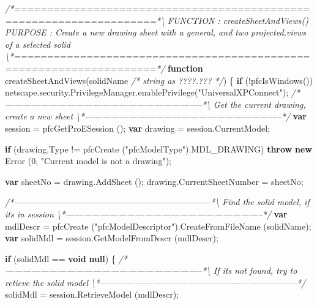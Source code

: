 \documentclass[]{article}
\newenvironment{Shaded}{}{}
\newcommand{\KeywordTok}[1]{\textcolor[rgb]{0.00,0.44,0.13}{\textbf{{#1}}}}
\newcommand{\DecValTok}[1]{\textcolor[rgb]{0.25,0.63,0.44}{{#1}}}
\newcommand{\StringTok}[1]{\textcolor[rgb]{0.25,0.44,0.63}{{#1}}}
\newcommand{\CommentTok}[1]{\textcolor[rgb]{0.38,0.63,0.69}{\textit{{#1}}}}
\newcommand{\OtherTok}[1]{\textcolor[rgb]{0.00,0.44,0.13}{{#1}}}
\newcommand{\FunctionTok}[1]{\textcolor[rgb]{0.02,0.16,0.49}{{#1}}}
\newcommand{\NormalTok}[1]{{#1}}
\begin{document}
\begin{Shaded}
\begin{Highlighting}[]
\CommentTok{/*====================================================================*\textbackslash{} }
\CommentTok{FUNCTION : createSheetAndViews() }
\CommentTok{PURPOSE  : Create a new drawing sheet with a general, and two}
\CommentTok{           projected,views of a selected solid }
\CommentTok{\textbackslash{}*====================================================================*/} 
\KeywordTok{function} \FunctionTok{createSheetAndViews}\NormalTok{(solidName }\CommentTok{/* string as ????.??? */}\NormalTok{)}
\NormalTok{\{}
  \KeywordTok{if} \NormalTok{(!}\FunctionTok{pfcIsWindows}\NormalTok{())}
    \OtherTok{netscape}\NormalTok{.}\OtherTok{security}\NormalTok{.}\OtherTok{PrivilegeManager}\NormalTok{.}\FunctionTok{enablePrivilege}\NormalTok{(}\StringTok{"UniversalXPConnect"}\NormalTok{); }
\CommentTok{/*--------------------------------------------------------------------*\textbackslash{} }
\CommentTok{  Get the current drawing, create a new sheet}
\CommentTok{\textbackslash{}*--------------------------------------------------------------------*/}
  \KeywordTok{var} \NormalTok{session = }\FunctionTok{pfcGetProESession} \NormalTok{();}
  \KeywordTok{var} \NormalTok{drawing = }\OtherTok{session}\NormalTok{.}\FunctionTok{CurrentModel}\NormalTok{;}
  
  \KeywordTok{if} \NormalTok{(}\OtherTok{drawing}\NormalTok{.}\FunctionTok{Type} \NormalTok{!= }\FunctionTok{pfcCreate} \NormalTok{(}\StringTok{"pfcModelType"}\NormalTok{).}\FunctionTok{MDL_DRAWING}\NormalTok{)}
    \KeywordTok{throw} \KeywordTok{new} \FunctionTok{Error} \NormalTok{(}\DecValTok{0}\NormalTok{, }\StringTok{"Current model is not a drawing"}\NormalTok{);}
  
  \KeywordTok{var} \NormalTok{sheetNo = }\OtherTok{drawing}\NormalTok{.}\FunctionTok{AddSheet} \NormalTok{();}
  \OtherTok{drawing}\NormalTok{.}\FunctionTok{CurrentSheetNumber} \NormalTok{= sheetNo;}
  
\CommentTok{/*--------------------------------------------------------------------*\textbackslash{} }
\CommentTok{  Find the solid model, if its in session}
\CommentTok{\textbackslash{}*--------------------------------------------------------------------*/}
  \KeywordTok{var} \NormalTok{mdlDescr = }
    \FunctionTok{pfcCreate} \NormalTok{(}\StringTok{"pfcModelDescriptor"}\NormalTok{).}\FunctionTok{CreateFromFileName} \NormalTok{(solidName);}
  \KeywordTok{var} \NormalTok{solidMdl = }\OtherTok{session}\NormalTok{.}\FunctionTok{GetModelFromDescr} \NormalTok{(mdlDescr);}
  
  \KeywordTok{if} \NormalTok{(solidMdl == }\KeywordTok{void} \KeywordTok{null}\NormalTok{)}
    \NormalTok{\{}
\CommentTok{/*--------------------------------------------------------------------*\textbackslash{}     }
\CommentTok{  If its not found, try to retieve the solid model}
\CommentTok{\textbackslash{}*--------------------------------------------------------------------*/} 
      \NormalTok{solidMdl = }\OtherTok{session}\NormalTok{.}\FunctionTok{RetrieveModel} \NormalTok{(mdlDescr);}
      

\end{Highlighting}
\end{Shaded}
\end{document}
